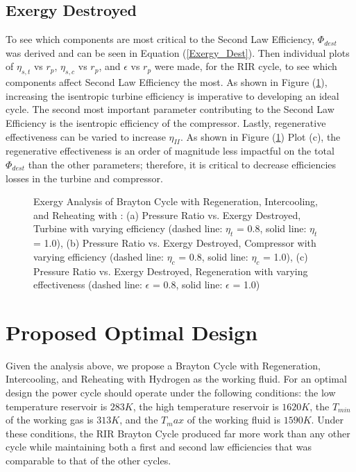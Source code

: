 \documentclass[
	12pt, %
]{brayton_cycle_report_style}
\begin{document}
\subsection{Exergy Destroyed}

To see which components are most critical to the Second Law Efficiency, $\Phi_{dest}$ was derived and can be seen in Equation (\ref{Exergy_Dest}). Then individual plots of $\eta_{s,t}$ vs $r_p$, $\eta_{s,c}$ vs $r_p$, and $\epsilon$ vs $r_p$ were made, for the RIR cycle, to see which components affect Second Law Efficiency the most. As shown in Figure (\ref{fig:Exergy_Plots}), increasing the isentropic turbine efficiency is imperative to developing an ideal cycle. The second most important parameter contributing to the Second Law Efficiency is the isentropic efficiency of the compressor. Lastly, regenerative effectiveness can be varied to increase $\eta_{II}$. As shown in Figure (\ref{fig:Exergy_Plots}) Plot (c), the regenerative effectiveness is an order of magnitude less impactful on the total $\Phi_{dest}$ than the other parameters; therefore, it is critical to decrease efficiencies losses in the turbine and compressor.



\begin{figure}%
    \centering
    \subfloat[\centering]{{}}%
    \qquad
    \subfloat[\centering]{{}}%
    \qquad
    \subfloat[\centering]{{}}%
    \qquad
    \caption{Exergy Analysis of Brayton Cycle with Regeneration, Intercooling, and Reheating with : (a) Pressure Ratio vs. Exergy Destroyed, Turbine with varying efficiency (dashed line: $\eta_t$ = 0.8, solid line: $\eta_t$ = 1.0), (b) Pressure Ratio vs. Exergy Destroyed, Compressor with varying efficiency (dashed line: $\eta_c$ = 0.8, solid line: $\eta_c$ = 1.0), (c) Pressure Ratio vs. Exergy Destroyed, Regeneration with varying effectiveness (dashed line: $\epsilon$ = 0.8, solid line: $\epsilon$ = 1.0)}%
    \label{fig:Exergy_Plots}%
\end{figure}




\section{Proposed Optimal Design}

Given the analysis above, we propose a Brayton Cycle with Regeneration, Intercooling, and Reheating with Hydrogen as the working fluid. For an optimal design the power cycle should operate under the following conditions: the low temperature reservoir is $283K$, the high temperature reservoir is $1620K$, the $T_{min}$ of the working gas is $313K$, and the $T_max$ of the working fluid is $1590K$. Under these conditions, the RIR Brayton Cycle produced far more work than any other cycle while maintaining both a first and second law efficiencies that was comparable to that of the other cycles.
\\
\end{document}
